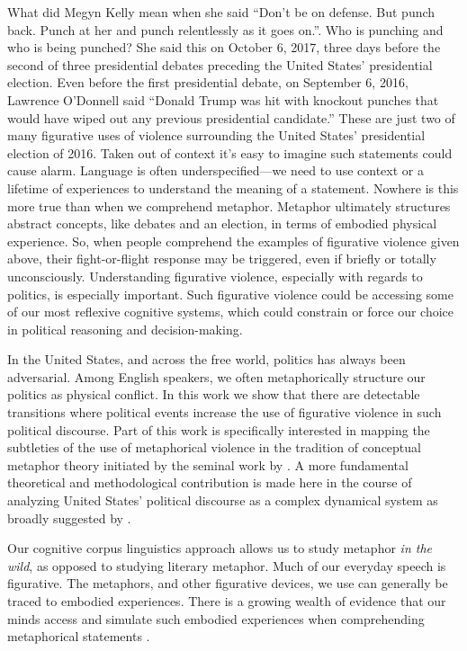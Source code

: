 What did Megyn Kelly mean when she said ``Don't be on defense. But punch back.
Punch at her and punch relentlessly as it goes on.''. Who is punching and
who is being punched? She said this on October 6, 2017, three days before 
the second of three presidential debates preceding the United States' presidential
election. Even before the first presidential debate, on September 6, 2016, 
Lawrence O'Donnell said ``Donald Trump was hit with knockout punches that
would have wiped out any previous presidential candidate.'' These are just
two of many figurative uses of violence surrounding the United States' 
presidential election of 2016. Taken out of context it's easy to imagine
such statements could cause alarm. Language is often underspecified---we need
to use context or a lifetime of experiences to understand the meaning of 
a statement. Nowhere is this more true than when we comprehend metaphor. 
Metaphor ultimately structures abstract concepts, like debates and an election,
in terms of embodied physical experience. So, when people comprehend the
examples of figurative violence given above, their fight-or-flight response may
be triggered, even if briefly or totally unconsciously. Understanding figurative
violence, especially with regards to politics, is especially important. Such
figurative violence could be accessing some of our most reflexive cognitive
systems, which could constrain or force our choice in political reasoning
and decision-making.

In the United States, and across the free world, politics has always been
adversarial. Among English speakers, we often metaphorically structure 
our politics as physical conflict. In this work we show that there are detectable
transitions where political events increase the use of figurative violence
in such political discourse. Part of this work is specifically interested in
mapping the subtleties of the use of metaphorical violence in the tradition of
conceptual metaphor theory initiated by the seminal work by .
A more fundamental theoretical and methodological contribution is made here
in the course of analyzing United States' political discourse as a 
complex dynamical system as broadly suggested by .

Our cognitive corpus linguistics approach allows us to study metaphor 
\textit{in the wild}, as opposed to studying literary metaphor. Much of 
our everyday speech is figurative. The metaphors, and other figurative 
devices, we use can generally be traced to embodied experiences. There is a
growing wealth of evidence that our minds access and simulate such 
embodied experiences when comprehending metaphorical statements 
\cite{Gibbs2008}. 

